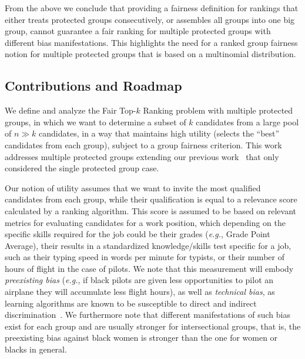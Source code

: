 From the above we conclude that providing a fairness definition for rankings that either treats protected groups consecutively, or assembles all groups into one big group, cannot guarantee a fair ranking for multiple protected groups with different bias manifestations.
%
This highlights the need for a ranked group fairness notion for multiple protected groups that is based on a multinomial distribution.
%

\subsection{Contributions and Roadmap}
We define and analyze the {\sc Fair Top-$k$ Ranking problem} with multiple protected groups, in which we want to determine a subset of $k$ candidates from a large pool of $n \gg k$ candidates, in a way that maintains high utility (selects the ``best'' candidates from each group), subject to a group fairness criterion.
%
This work addresses multiple protected groups extending our previous work~\cite{zehlike2017fair} that only considered the single protected group case.
%
%

Our notion of utility assumes that we want to invite the most qualified candidates from each group, while their qualification is equal to a relevance score calculated by a ranking algorithm.
%
This score is assumed to be based on relevant metrics for evaluating candidates for a work position, which depending on the specific skills required for the job could be their grades ({\em e.g.}, Grade Point Average), their results in a standardized knowledge/skills test specific for a job, such as their typing speed in words per minute for typists, or their number of hours of flight in the case of pilots.
%
We note that this measurement will embody \emph{preexisting bias} ({\em e.g.}, if black pilots are given less opportunities to pilot an airplane they will accumulate less flight hours), as well as \emph{technical bias}, as learning algorithms are known to be susceptible to direct and indirect discrimination~\cite{tuto2016,HajianFerrer12}.
%
We furthermore note that different manifestations of such bias exist for each group and are usually stronger for intersectional groups, that is, the preexisting bias against black women is stronger than the one for women or blacks in general.
%

